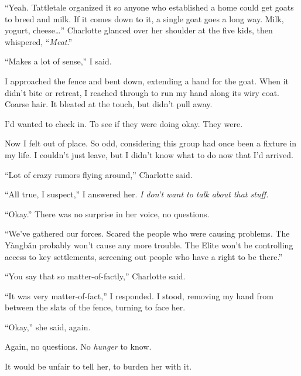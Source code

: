 ``Yeah.  Tattletale organized it so anyone who established a home could get goats to breed and milk.  If it comes down to it, a single goat goes a long way.  Milk, yogurt, cheese\ldots''  Charlotte glanced over her shoulder at the five kids, then whispered, ``\emph{Meat}.''



``Makes a lot of sense,'' I said.



I approached the fence and bent down, extending a hand for the goat.  When it didn't bite or retreat, I reached through to run my hand along its wiry coat.  Coarse hair.  It bleated at the touch, but didn't pull away.



I'd wanted to check in.  To see if they were doing okay.  They were.



Now I felt out of place.  So odd, considering this group had once been a fixture in my life.  I couldn't just leave, but I didn't know what to do now that I'd arrived.



``Lot of crazy rumors flying around,'' Charlotte said.



``All true, I suspect,'' I answered her.  \emph{I don't want to talk about that stuff.}



``Okay.''  There was no surprise in her voice, no questions.



``We've gathered our forces.  Scared the people who were causing problems.  The Y\`{a}ngb\v{a}n probably won't cause any more trouble.  The Elite won't be controlling access to key settlements, screening out people who have a right to be there.''



``You say that so matter-of-factly,'' Charlotte said.



``It was very matter-of-fact,'' I responded.  I stood, removing my hand from between the slats of the fence, turning to face her.



``Okay,'' she said, again.



Again, no questions.  No \emph{hunger} to know.



It would be unfair to tell her, to burden her with it.



